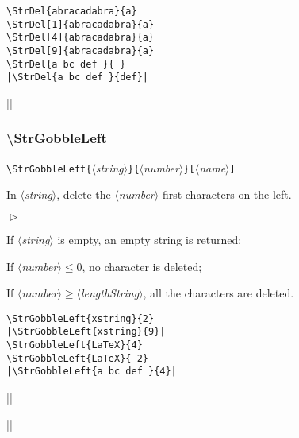 \documentclass[a4paper,10pt]{article}
\newcommand\argu[1]{$\langle$\textit{#1}$\rangle$}
\newcommand\ARGU[1]{\texttt{\{}\argu{#1}\texttt{\}}}
\newcommand\arguC[1]{\texttt{[}\argu{#1}\texttt{]}}
\newenvironment{Conditions}[1][1cm]%
{\begin{list}%
	{$\vartriangleright$}%
	{\setlength{\leftmargin}{#1}
	 \setlength{\itemsep}{0pt}
	 \setlength{\parsep}{0pt}
	 \setlength{\topsep}{2ptplus3ptminus2pt}
	}}%
{\end{list}}
\newcommand\styleexemple{\small\vskip4pt}
\newcommand\verbinline{\lstinline[basicstyle=\normalsize\ttfamily]}
\begin{document}
\begin{minipage}[t]{0.65\linewidth}
\begin{lstlisting}
\StrDel{abracadabra}{a}
\StrDel[1]{abracadabra}{a}
\StrDel[4]{abracadabra}{a}
\StrDel[9]{abracadabra}{a}
\StrDel{a bc def }{ }
|\StrDel{a bc def }{def}|
\end{lstlisting}%
\end{minipage}\hfill
\begin{minipage}[t]{0.35\linewidth}
	\styleexemple
	\par
	\par
	\par
	\par
	\par
	||
\end{minipage}%

\subsubsection{\ttfamily\textbackslash StrGobbleLeft}
\verbinline|\StrGobbleLeft|\ARGU{string}\ARGU{number}\arguC{name}
\smallskip

In \argu{string}, delete the \argu{number} first characters on the left.\medskip

\begin{Conditions}
\item If \argu{string} is empty, an empty string is returned;
\item If \argu{number}${}\leqslant0$, no character is deleted;
\item If \argu{number}${}\geqslant{}$\argu{lengthString}, all the characters are deleted.
\end{Conditions}

\begin{minipage}[t]{0.65\linewidth}
\begin{lstlisting}
\StrGobbleLeft{xstring}{2}
|\StrGobbleLeft{xstring}{9}|
\StrGobbleLeft{LaTeX}{4}
\StrGobbleLeft{LaTeX}{-2}
|\StrGobbleLeft{a bc def }{4}|
\end{lstlisting}%
\end{minipage}\hfill
\begin{minipage}[t]{0.35\linewidth}
	\styleexemple
	\par
	||\par
	\par
	\par
	||
\end{minipage}%
\end{document}
